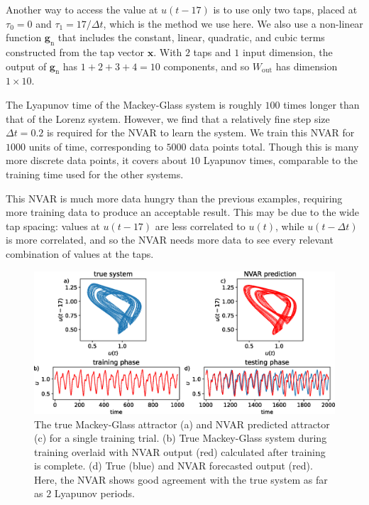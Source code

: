 Another way to access the value at $u(t-17)$ is to use only two taps,
placed at $\tau_0 = 0$ and $\tau_1 = 17 / \Delta t$, which is the
method we use here. We also use a non-linear function
$\bm{g}_\text{n}$ that includes the constant, linear, quadratic, and
cubic terms constructed from the tap vector $\bm{x}$. With $2$ taps
and $1$ input dimension, the output of $\bm{g}_\text{n}$ has $1 + 2 +
3 + 4 = 10$ components, and so $W_\text{out}$ has dimension $1 \times
10$.

The Lyapunov time of the Mackey-Glass system is roughly $100$ times
longer than that of the Lorenz system. However, we find that a
relatively fine step size $\Delta t = 0.2$ is required for the NVAR to
learn the system. We train this NVAR for $1000$ units of time,
corresponding to $5000$ data points total. Though this is many more
discrete data points, it covers about $10$ Lyapunov times, comparable
to the training time used for the other systems.

This NVAR is much more data hungry than the previous examples,
requiring more training data to produce an acceptable result. This may
be due to the wide tap spacing: values at $u(t - 17)$ are less
correlated to $u(t)$, while $u(t - \Delta t)$ is more correlated, and
so the NVAR needs more data to see every relevant combination of
values at the taps.

\begin{figure}
  \includegraphics[width=\textwidth]{figures/nvar-predict-mackey-glass}
  \caption{The true Mackey-Glass attractor (a) and NVAR predicted
    attractor (c) for a single training trial. (b) True Mackey-Glass
    system during training overlaid with NVAR output (red) calculated
    after training is complete. (d) True (blue) and NVAR forecasted
    output (red). Here, the NVAR shows good agreement with the true
    system as far as $2$ Lyapunov periods.}
  \label{fig:nvar-predict-mackey-glass}
\end{figure}

